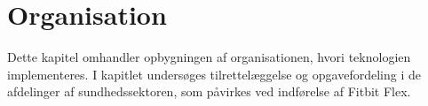 \chapter{Organisation}
Dette kapitel omhandler opbygningen af organisationen, hvori teknologien implementeres. I kapitlet undersøges tilrettelæggelse og opgavefordeling i de afdelinger af sundhedssektoren, som påvirkes ved indførelse af Fitbit Flex.
